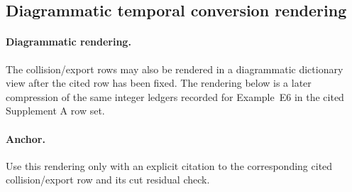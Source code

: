 \subsection{Diagrammatic temporal conversion rendering}\label{app:feynman-dict}
\paragraph{Diagrammatic rendering.} The collision/export rows may also be rendered in a diagrammatic dictionary view after the cited row has been fixed. The rendering below is a later compression of the same integer ledgers recorded for Example~E6 in the cited Supplement A row set.

\begin{center}
\end{center}

\paragraph{Anchor.} Use this rendering only with an explicit citation to the corresponding cited collision/export row and its cut residual check.
